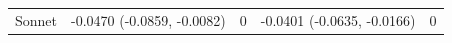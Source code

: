 \begin{tabular}{p{2.2cm}rrrr}
\quad Sonnet & -0.0470 (-0.0859, -0.0082) & 0 & -0.0401 (-0.0635, -0.0166) & 0 \\

\end{tabular}
